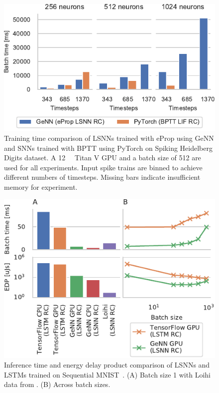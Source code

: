 \documentclass[sigconf]{acmart}
\begin{document}
\begin{figure}[t]
  \centering
  \includegraphics{figures/training_time.pdf}
  \caption{Training time comparison of LSNNs trained with eProp using GeNN and SNNs trained with BPTT using PyTorch on Spiking Heidelberg Digits dataset. A \SI{12}{\giga\byte} Titan V GPU and a batch size of \num{512} are used for all experiments. Input spike trains are binned to achieve different numbers of timesteps. Missing bars indicate insufficient memory for experiment.}
  \label{fig:training_time}
\end{figure}

\begin{figure}[t]
  \centering
  \includegraphics{figures/lstm_vs_genn.pdf}
  \caption{Inference time and energy delay product comparison of LSNNs and LSTMs trained on Sequential MNIST~\citep{Plank2021}. 
  (A) Batch size 1 with Loihi data from \citet{Plank2021}. 
  (B) Across batch sizes.}
  \label{fig:lstm_vs_genn}
\end{figure}
\end{document}
